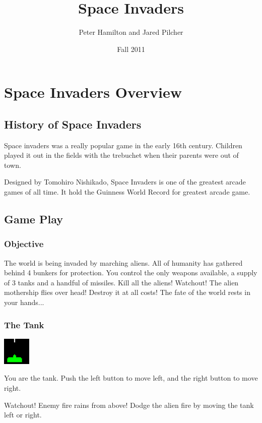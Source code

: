 \documentclass[11pt,letter,oneside]{report}
\begin{document}
\title{Space Invaders}
\author{Peter Hamilton and Jared Pilcher}
\date{Fall 2011}
\maketitle

\tableofcontents

\chapter{Space Invaders Overview}
\section{History of Space Invaders}

Space invaders was a really popular game in the early 16th century.  Children played it out in the fields with the trebuchet when their parents were out of town.

Designed by Tomohiro Nishikado, Space Invaders is one of the greatest arcade games of all time.  It hold the Guinness World Record for greatest arcade game.
 

\section{Game Play}

\subsection{Objective}

The world is being invaded by marching aliens.  All of humanity has gathered behind 4 bunkers for protection.  You control the only weapons available, a supply of 3 tanks and a handful of missiles. Kill all the aliens! Watchout! The alien mothership flies over head! Destroy it at all costs!  The fate of the world rests in your hands...

\subsection{The Tank}
\includegraphics[]{tank.jpg}

You are the tank. Push the left button to move left, and the right button to move right. 

Watchout! Enemy fire rains from above! Dodge the alien fire by moving the tank left or right. 
\end{document}
